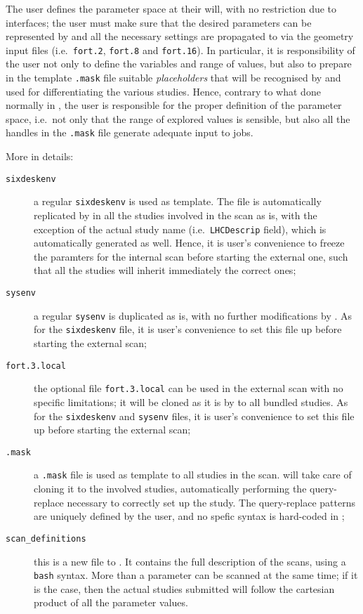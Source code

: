 The user defines the parameter space at their will, with no
restriction due to interfaces; the user must make sure that
the desired parameters can be represented by \MADX{}
and all the necessary settings are propagated to \SIXTRACK{} via
the geometry input files (i.e.~\texttt{fort.2}, \texttt{fort.8}
and \texttt{fort.16}). In particular, it is responsibility of the
user not only to define the variables and range of values,
but also to prepare in the template \texttt{.mask} file
suitable \emph{placeholders} that will be recognised by
\SIXDESK{} and used for differentiating the various studies.
Hence, contrary to what done normally in
\SIXDESK{}, the user is responsible for the proper definition
of the parameter space, i.e.~not only that the range of explored
values is sensible, but also all the handles in the \texttt{.mask}
file generate adequate input to \SIXTRACK{} jobs.

More in details:
\begin{description}
\item[\texttt{sixdeskenv}] a regular \texttt{sixdeskenv} is used as template.
  The file is automatically replicated by \SIXDESK{} in all the studies
  involved in the scan as is, with the exception of the actual study name
  (i.e.~\texttt{LHCDescrip} field), which is automatically generated as well.
  Hence, it is user's convenience to freeze the paramters for the internal
  scan before starting the external one,
  such that all the studies will inherit immediately the correct ones;
\item[\texttt{sysenv}] a regular \texttt{sysenv} is duplicated as is, with
  no further modifications by \SIXDESK{}. As for the \texttt{sixdeskenv} file, 
  it is user's convenience to set this file up before starting the
  external scan;
\item[\texttt{fort.3.local}] the optional file \texttt{fort.3.local}
  can be used in the external scan with no specific limitations; it
  will be cloned as it is by \SIXDESK{} to all bundled studies. As for the
  \texttt{sixdeskenv} and \texttt{sysenv} files, it is user's convenience
  to set this file up before starting the external scan;
\item[\texttt{.mask}] a \texttt{.mask} file is used as template to all studies
  in the scan. \SIXDESK{} will take care of cloning it to the involved studies,
  automatically performing the query-replace necessary to correctly set up
  the study. The query-replace patterns are uniquely defined by the user,
  and no spefic syntax is hard-coded in \SIXDESK{};
\item[\texttt{scan\_definitions}] this is a new file to \SIXDESK{}. It contains
  the full description of the scans, using a \texttt{bash} syntax. More than a
  parameter can be scanned at the same time; if it is the case, then the actual
  studies submitted will follow the cartesian product of all the parameter
  values.
\end{description}

